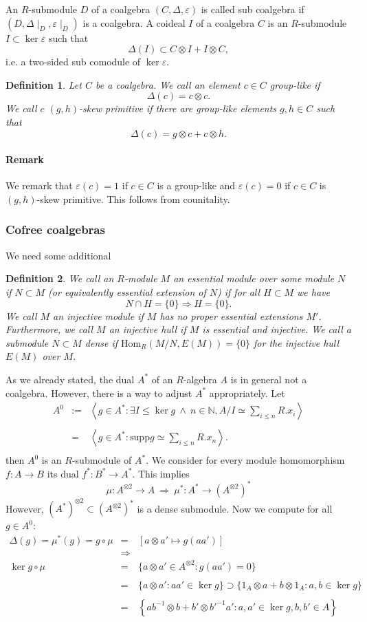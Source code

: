 \documentclass[10pt,a4paper]{article}
\newcommand{\eps}{\varepsilon}
\newcommand{\bao}[1]{\begin{array}{#1}}
\newcommand{\ea}{\end{array}}
\newcommand{\bmk}{\paragraph{Remark}}
\newcommand{\tens}[2]{\left(#1\right)^{\otimes #2}}
\newcommand{\tenso}[2]{#1^{\otimes #2}}
\newcommand{\twotens}[1]{\tens{#1}{2}}
\newcommand{\twotenso}[1]{\tenso{#1}{2}}
\newtheorem{defi}{Definition}
\begin{document}
An $R$-submodule $D$ of a coalgebra $(C, \Delta, \eps)$ is called sub coalgebra if $(D, \Delta\mid_D, \eps\mid_D)$ is a coalgebra. A coideal $I$ of a coalgebra $C$ is an $R$-submodule $I \subset \ker \eps$ such that
$$\Delta(I) \subset C \otimes I + I \otimes C,$$
i.e. a two-sided sub comodule of $\ker \eps$.
\begin{defi}
Let $C$ be a coalgebra. We call an element $c \in C$ group-like if
$$\Delta(c) = c \otimes c.$$
We call $c$ $(g,h)$-skew primitive if there are group-like elements $g, h \in C$ such that
$$\Delta(c) = g \otimes c + c \otimes h.$$
\end{defi}
\bmk We remark that $\eps(c) = 1$ if $c \in C$ is a group-like and $\eps(c) = 0$ if $c \in C$ is $(g,h)$-skew primitive. This follows from counitality.
\subsubsection{Cofree coalgebras}
We need some additional
\begin{defi}
We call an $R$-module $M$ an essential module over some module $N$ if $N \subset M$ (or equivalently essential extension of $N$) if for all $H \subset M$ we have
$$N \cap H = \{0\} \Rightarrow H = \{0\}.$$
We call $M$ an injective module if $M$ has no proper essential extensions $M'$. Furthermore, we call $M$ an injective hull if $M$ is essential and injective. We call a submodule $N \subset M$ dense if $\mathrm{Hom}_R(M/N,E(M)) = \{0\}$ for the injective hull $E(M)$ over $M$.
\end{defi}
As we already stated, the dual $A^\ast$ of an $R$-algebra $A$ is in general not a coalgebra. However, there is a way to adjust $A^\ast$ appropriately. Let
$$\bao{rcl}
A^0 &:=& \left<g \in A^\ast : \exists I \leq \ker g\ \wedge\ n \in \mathbb{N}, A/I \simeq \sum_{i \leq n} R.x_i\right>\\&&\\ &=& \left<g \in A^\ast : \mathrm{supp} g \simeq \sum_{i\leq n} R.x_n\right>.\\\ea$$
then $A^0$ is an $R$-submodule of $A^\ast$. We consider for every module homomorphism $f : A \longrightarrow B$ its dual $f^\ast : B^\ast \longrightarrow A^\ast$. This implies
$$\mu : \twotenso{A} \longrightarrow A\ \Rightarrow\ \mu^\ast : A^\ast \longrightarrow \left(\twotenso{A}\right)^\ast$$
However, $\twotens{A^\ast} \subset \left(\twotenso{A}\right)^\ast$ is a dense submodule. Now we compute for all $g \in A^0$:
$$\bao{rcl}
\Delta(g) = \mu^\ast(g) = g \circ \mu &=& [a \otimes a' \longmapsto g(a a')]\\
&\Rightarrow&\\
\ker g \circ \mu &=& \{a \otimes a' \in \twotenso{A} : g(a a') = 0\}\\
&&\\
&=& \{a \otimes a' : a a' \in \ker g\} \supset \{1_A \otimes a + b \otimes 1_A : a, b \in \ker g\}\\
&&\\
&=& \left\{a b^{-1} \otimes b + b' \otimes b'^{-1} a' : a, a' \in \ker g, b , b' \in A\right\}
\ea$$
\end{document}
